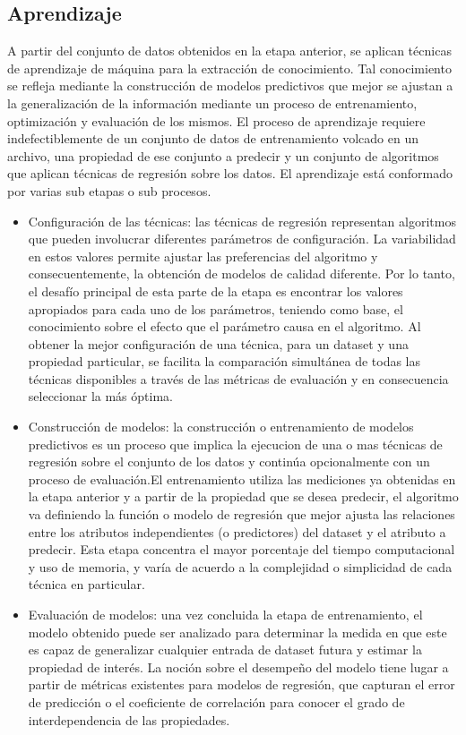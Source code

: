 \subsection*{Aprendizaje}

A partir del conjunto de datos obtenidos en la etapa anterior, se
aplican técnicas de aprendizaje de máquina para la extracción de conocimiento.
Tal conocimiento se refleja mediante la construcción de modelos predictivos
que mejor se ajustan a la generalización de la información mediante
un proceso de entrenamiento, optimización y evaluación de los mismos.
El proceso de aprendizaje requiere indefectiblemente de un conjunto
de datos de entrenamiento volcado en un archivo, una propiedad de
ese conjunto a predecir y un conjunto de algoritmos que aplican técnicas
de regresión sobre los datos. El aprendizaje está conformado por varias
sub etapas o sub procesos.
\begin{itemize}
\item Configuración de las técnicas: las técnicas de regresión representan
algoritmos que pueden involucrar diferentes parámetros de configuración.
La variabilidad en estos valores permite ajustar las preferencias
del algoritmo y consecuentemente, la obtención de modelos de calidad
diferente. Por lo tanto, el desafío principal de esta parte de la
etapa es encontrar los valores apropiados para cada uno de los parámetros,
teniendo como base, el conocimiento sobre el efecto que el parámetro
causa en el algoritmo. Al obtener la mejor configuración de una técnica,
para un dataset y una propiedad particular, se facilita la comparación
simultánea de todas las técnicas disponibles a través de las métricas
de evaluación y en consecuencia seleccionar la más óptima. 
\item Construcción de modelos: la construcción o entrenamiento de modelos
predictivos es un proceso que implica la ejecucion de una o mas técnicas
de regresión sobre el conjunto de los datos y continúa opcionalmente
con un proceso de evaluación.El entrenamiento utiliza las mediciones
ya obtenidas en la etapa anterior y a partir de la propiedad que se
desea predecir, el algoritmo va definiendo la función o modelo de
regresión que mejor ajusta las relaciones entre los atributos independientes
(o predictores) del dataset y el atributo a predecir. Esta etapa concentra
el mayor porcentaje del tiempo computacional y uso de memoria, y varía
de acuerdo a la complejidad o simplicidad de cada técnica en particular. 
\item Evaluación de modelos: una vez concluida la etapa de entrenamiento,
el modelo obtenido puede ser analizado para determinar la medida en
que este es capaz de generalizar cualquier entrada de dataset futura
y estimar la propiedad de interés. La noción sobre el desempeño del
modelo tiene lugar a partir de métricas existentes para modelos de
regresión, que capturan el error de predicción o el coeficiente de
correlación para conocer el grado de interdependencia de las propiedades. 
\end{itemize}

